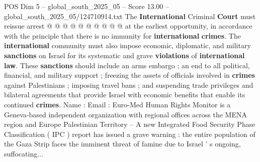 \begin{textsample}{POS Dim 5 – global\_south\_2025\_05 – Score 13.00 – global\_south\_2025\_05/124710914.txt}
The \textbf{International} Criminal \textbf{Court} must reissue arrest @ @ @ @ @ @ @ @ @ @ at the earliest opportunity, in accordance with the principle that there is no immunity for \textbf{international} \textbf{crimes}.
The \textbf{international} community must also impose economic, diplomatic, and military \textbf{sanctions} on Israel for its systematic and grave \textbf{violations} of \textbf{international} \textbf{law}.
These \textbf{sanctions} should include an arms embargo ; an end to all political, financial, and military support ; freezing the assets of officials involved in \textbf{crimes} against Palestinians ; imposing travel bans ; and suspending trade privileges and bilateral agreements that provide Israel with economic benefits that enable its continued \textbf{crimes}.
Name : Email : Euro-Med Human Rights Monitor is a Geneva-based independent organization with regional offices across the MENA region and Europe Palestinian Territory -- A new Integrated Food Security Phase Classification ( IPC ) report has issued a grave warning : the entire population of the Gaza Strip faces the imminent threat of famine due to Israel ' s ongoing, suffocating...

\end{textsample}
